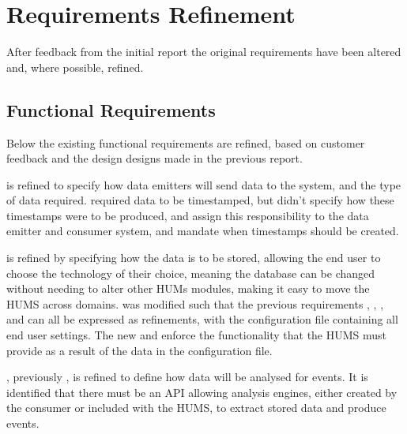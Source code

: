 \section{Requirements Refinement}
\label{sec:requirements}
After feedback from the initial report the original requirements have been altered and, where possible, refined.

\subsection{Functional Requirements}
\label{sec:requirements-functional}
Below the existing functional requirements are refined, based on customer feedback and the design designs made in the previous report.

 is refined to specify how data emitters will send data to the system, and the type of data required. 
 required data to be timestamped, but didn't specify how these timestamps were to be produced,  and  assign this
responsibility to the data emitter and consumer system, and mandate when timestamps should be created.

 is refined by specifying how the data is to be stored, allowing the end user to choose the technology of their choice, meaning the database can be changed without needing to alter other HUMs modules, making it easy to move the HUMS across domains.
 was modified such that the previous requirements , , , and  can all be expressed as refinements, with the configuration file containing all end user settings. The new  and  enforce the  functionality that the HUMS must provide as a result of the data in the configuration file.

, previously , is refined to define how data will be analysed for events. It is identified that there must be an API allowing analysis engines, either created by the consumer or included with the HUMS, to extract stored data and produce events. 

